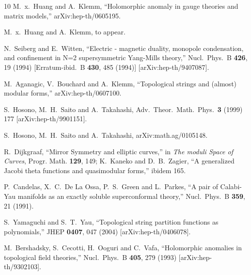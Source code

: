 \documentclass[12pt]{article}
\begin{document}
\begin{thebibliography}{10}
  M.~x.~Huang and A.~Klemm,
  ``Holomorphic anomaly in gauge theories and matrix models,''
  arXiv:hep-th/0605195.

  M.~x.~Huang and A.~Klemm,
  to appear.

  N.~Seiberg and E.~Witten,
   ``Electric - magnetic duality, monopole condensation, and confinement in N=2
    supersymmetric Yang-Mills theory,''
  Nucl.\ Phys.\ B {\bf 426}, 19 (1994)
  [Erratum-ibid.\ B {\bf 430}, 485 (1994)]
  [arXiv:hep-th/9407087].


  M.~Aganagic, V.~Bouchard and A.~Klemm,
  ``Topological strings and (almost) modular forms,''
  arXiv:hep-th/0607100.



  S.~Hosono, M.~H.~Saito and A.~Takahashi,
  Adv.\ Theor.\ Math.\ Phys.\  {\bf 3} (1999) 177
  [arXiv:hep-th/9901151].

  S.~Hosono, M.~H.~Saito and A.~Takahashi,
  arXiv:math.ag/0105148.

 R.~Dijkgraaf, ``Mirror Symmetry and elliptic curves,'' in {\sl
The moduli Space of Curves}, Progr. Math. {\bf 129}, 149;
K.~Kaneko and D.~B.~Zagier, ``A generalized Jacobi theta functions
and quasimodular forms,'' ibidem 165.


  P.~Candelas, X.~C.~De La Ossa, P.~S.~Green and L.~Parkes,
   ``A pair of Calabi-Yau manifolds as an exactly soluble superconformal
  theory,''
  Nucl.\ Phys.\ B {\bf 359}, 21 (1991).

  S.~Yamaguchi and S.~T.~Yau,
  ``Topological string partition functions as polynomials,''
  JHEP {\bf 0407}, 047 (2004)
  [arXiv:hep-th/0406078].


  M.~Bershadsky, S.~Cecotti, H.~Ooguri and C.~Vafa,
   ``Holomorphic anomalies in topological field theories,''
  Nucl.\ Phys.\ B {\bf 405}, 279 (1993)
  [arXiv:hep-th/9302103].


\end{thebibliography}
\end{document}
